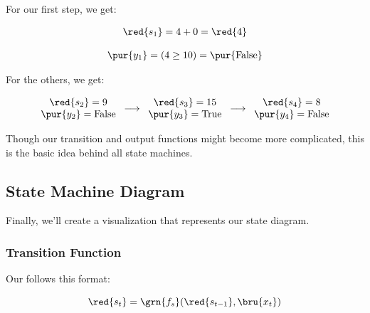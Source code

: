         For our first step, we get:
        
        \begin{equation}
            \begin{matrix}
                \red{s_1} = 4+0 = \red{4} \\
                \\
                \pur{y_1} = ( 4 \geq 10 ) = \text{\pur{False}}
            \end{matrix}
        \end{equation}
        
        For the others, we get:
        
        \begin{equation}
            \begin{matrix}
                \red{s_2} = 9 \\ \pur{y_2} = \text{False}
            \end{matrix}
            \;\; \longrightarrow \;\; 
            \begin{matrix}
                \red{s_3} = 15 \\ \pur{y_3} = \text{True}
            \end{matrix}
            \;\; \longrightarrow \;\; 
            \begin{matrix}
                \red{s_4} = 8 \\ \pur{y_4} = \text{False}
            \end{matrix}
        \end{equation}
        
        Though our transition and output functions might become more complicated, this is the basic idea behind all state machines.

    \subsection{State Machine Diagram}
    
        Finally, we'll create a visualization that represents our state diagram.
        
        \subsubsection{Transition Function}
        
            Our  follows this format:
            
            \begin{equation}
                \red{s_t} = 
                \grn{f_s}(\red{s_{t-1}}, \bru{x_t})
            \end{equation}
            
